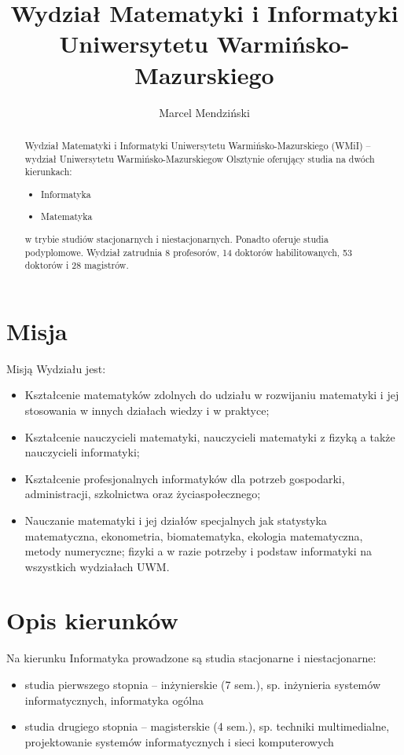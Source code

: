 \documentclass[a4paper,12pt]{article}
\title{Wydział Matematyki i Informatyki Uniwersytetu
Warmińsko-Mazurskiego}
\author{Marcel Mendziński}
\begin{document}
\maketitle  
\tableofcontents
\begin{abstract}
	 Wydział Matematyki i Informatyki Uniwersytetu Warmińsko-Mazurskiego (WMiI) – wydział
Uniwersytetu Warmińsko-Mazurskiegow Olsztynie oferujący studia na dwóch kierunkach:
	
	\begin{itemize}
		\item Informatyka
		\item Matematyka
	\end{itemize}
	
w trybie studiów stacjonarnych i niestacjonarnych. Ponadto oferuje studia podyplomowe.
Wydział zatrudnia 8 profesorów, 14 doktorów habilitowanych, 53 doktorów i 28 magistrów.
\end{abstract}

\section{Misja}
	Misją Wydziału jest:
\begin{itemize}
	\item Kształcenie matematyków zdolnych do udziału w rozwijaniu matematyki i jej stosowania w innych działach wiedzy i w praktyce;
	\item Kształcenie nauczycieli matematyki, nauczycieli matematyki z fizyką a także nauczycieli informatyki;
	\item Kształcenie profesjonalnych informatyków dla potrzeb gospodarki, administracji, szkolnictwa oraz życiaspołecznego;
	\item Nauczanie matematyki i jej działów specjalnych jak statystyka matematyczna, ekonometria, biomatematyka, ekologia matematyczna, metody numeryczne; fizyki a w razie potrzeby i podstaw informatyki na wszystkich wydziałach UWM.
\end{itemize}
	
\section{Opis kierunków}

	Na kierunku Informatyka prowadzone są studia stacjonarne i niestacjonarne:
	\begin{itemize}
		\item studia pierwszego stopnia – inżynierskie (7 sem.), sp. inżynieria systemów informatycznych, informatyka ogólna
		\item studia drugiego stopnia – magisterskie (4 sem.), sp. techniki multimedialne, projektowanie systemów informatycznych i sieci komputerowych
	\end{itemize}
	
	
	
\end{document}
